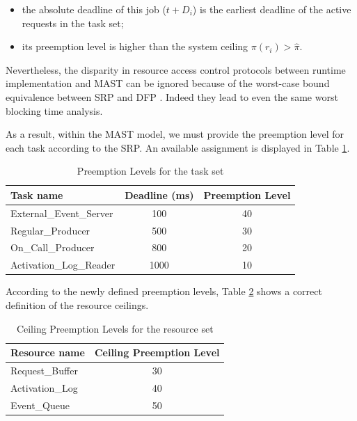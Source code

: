 \documentclass{article}
\begin{document}
\begin{itemize}
   \item the absolute deadline of this job ($t + D_i$) is the earliest deadline of the active requests in the task set;
   \item its preemption level is higher than the system ceiling $\pi(r_i) > \hat{\pi}$.
\end{itemize}

Nevertheless, the disparity in resource access control protocols between runtime implementation and MAST can be ignored because of
the worst-case bound equivalence between SRP and DFP \cite{resource-sharing}. Indeed they lead to even the same worst blocking time analysis.

As a result, within the MAST model, we must provide the preemption level for each task according to the SRP. An available assignment is displayed in Table \ref{tab:preemption-levels}.

\begin{table}[!htbp]
   \centering
   \begin{tabular}{lcc}
     \toprule
     Task name & Deadline (ms) & Preemption Level \\
     \midrule
     External\_Event\_Server & 100 & 40 \\
     Regular\_Producer & 500 & 30 \\
     On\_Call\_Producer & 800 & 20 \\
     Activation\_Log\_Reader & 1000 & 10 \\
     \bottomrule
   \end{tabular}
   \caption{Preemption Levels for the task set}
   \label{tab:preemption-levels}
\end{table}

According to the newly defined preemption levels, Table \ref{tab:ceiling-preemption-level} shows a correct definition of the resource ceilings.

\begin{table}[!htbp]
   \centering
   \begin{tabular}{lc}
     \toprule
     Resource name & Ceiling Preemption Level \\
     \midrule
     Request\_Buffer & 30 \\
     Activation\_Log & 40 \\
     Event\_Queue & 50 \\
     \bottomrule
   \end{tabular}
   \caption{Ceiling Preemption Levels for the resource set}
   \label{tab:ceiling-preemption-level}
\end{table}
\end{document}
